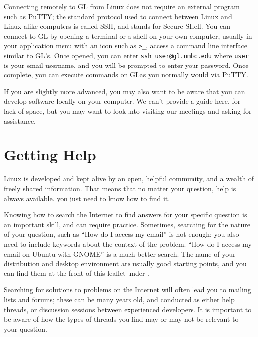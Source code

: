 \documentclass[11pt,notumble]{leaflet}
\begin{document}
Connecting remotely to GL from Linux does not require an external program such
as PuTTY\@; the standard protocol used to connect between Linux and Linux-alike
computers is called SSH, and stands for Secure SHell. You can connect to GL by
opening a terminal or a shell on your own computer, usually in your application
menu with an icon such as \verb+>_+, access a command line interface similar to
GL's. Once opened, you can enter \verb+ssh user@gl.umbc.edu+ where \verb+user+
is your email username, and you will be prompted to enter your password. Once
complete, you can execute commands on GL\@ as you normally would via PuTTY\@.

If you are slightly more advanced, you may also want to be aware that you can
develop software locally on your computer. We can't provide a guide here, for
lack of space, but you may want to look into visiting our meetings and asking
for assistance.


\section{Getting Help}
\label{section:getting-help}

Linux is developed and kept alive by an open, helpful community, and a wealth of
freely shared information. That means that no matter your question, help is
always available, you just need to know how to find it.

Knowing how to search the Internet to find answers for your specific question is
an important skill, and can require practice. Sometimes, searching for the
nature of your question, such as ``How do I access my email'' is not enough; you
also need to include keywords about the context of the problem. ``How do I
access my email on Ubuntu with GNOME'' is a much better search. The name of your
distribution and desktop environment are usually good starting points, and you
can find them at the front of this leaflet under .

Searching for solutions to problems on the Internet will often lead you to
mailing lists and forums; these can be many years old, and conducted as either
help threads, or discussion sessions between experienced developers. It is
important to be aware of how the types of threads you find may or may not be
relevant to your question.
\end{document}
